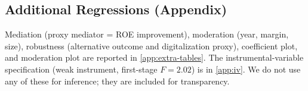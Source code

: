 \subsection{Additional Regressions (Appendix)}

Mediation (proxy mediator = ROE improvement), moderation (year, margin, size), robustness (alternative outcome and digitalization proxy), coefficient plot, and moderation plot are reported in \ref{app:extra-tables}. The instrumental-variable specification (weak instrument, first-stage $F = 2.02$) is in \ref{app:iv}. We do not use any of these for inference; they are included for transparency.
